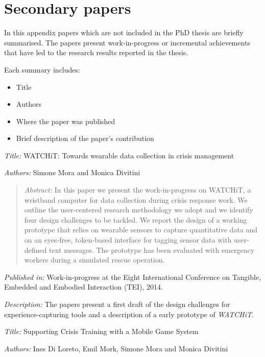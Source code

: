 \chapter{Secondary papers}
\label{secondary-papers}

In this appendix papers which are not included in the PhD thesis are briefly summarised. The papers present work-in-progress or incremental achievements that have led to the research results reported in the thesis.

Each summary includes:

\begin{itemize}
	\item Title
	\item Authors
	\item Where the paper was published
	\item Brief description of the paper's contribution
\end{itemize}


\emph{Title: }WATCHiT: Towards wearable data collection in crisis management

\emph{Authors: }Simone Mora and Monica Divitini

\begin{quote}
	\emph{Abstract: }In this paper we present the work-in-progress on WATCHiT, a wristband computer for data collection during crisis response work. We outline the user-centered research methodology we adopt and we identify four design challenges to be tackled. We report the design of a working prototype that relies on wearable sensors to capture quantitative data and on an eyes-free, token-based interface for tagging sensor data with user-defined text messages. The prototype has been evaluated with emergency workers during a simulated rescue operation.
\end{quote}

\emph{Published in: }Work-in-progress at the Eight International Conference on Tangible, Embedded and Embodied Interaction (TEI), 2014.

\emph{Description: }The papers present a first draft of the design challenges for experience-capturing tools and a description of a early prototype of \emph{WATCHiT}. 


\emph{Title: }Supporting Crisis Training with a Mobile Game System

\emph{Authors: }Ines Di Loreto, Emil Mork, Simone Mora and Monica Divitini

